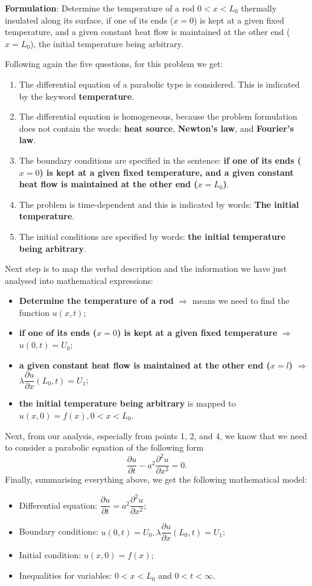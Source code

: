 {\bfseries Formulation}: Determine the temperature of a rod $0<x<L_{0}$ thermally insulated along its surface, if one of its ends ($x=0$) is kept at a given fixed temperature, and a given constant heat flow is maintained at the other end ($x=L_{0}$), the initial temperature being arbitrary.\par
Following again the five questions, for this problem we get:
\begin{enumerate}
\item The differential equation of a parabolic type is considered. This is indicated by the keyword {\bfseries temperature}.
\item The differential equation is homogeneous, because the problem formulation does not contain the words: {\bfseries heat source}, {\bfseries Newton's law}, and {\bfseries Fourier's law}.
\item The boundary conditions are specified in the sentence: {\bfseries if one of its ends ($x=0$) is kept at a given fixed temperature, and a given constant heat flow is maintained at the other end ($x=L_{0}$)}.
\item The problem is time-dependent and this is indicated by words: {\bfseries The initial temperature}.
\item The initial conditions are specified by words: {\bfseries the initial temperature being arbitrary}.
\end{enumerate}
Next step is to map the verbal description and the information we have just analysed into mathematical expressions:
\begin{itemize}
\item {\bfseries Determine the temperature of a rod} $\Longrightarrow$ means we need to find the function $u(x,t)$;
\item {\bfseries if one of its ends ($x=0$) is kept at a given fixed temperature} $\Longrightarrow$ $u(0,t)=U_{0}$;
\item {\bfseries a given constant heat flow is maintained at the other end ($x=l$)} $\Longrightarrow$ $\lambda \dfrac{\partial u}{\partial x}(L_{0},t)=U_{1}$;
\item {\bfseries the initial temperature being arbitrary} is mapped to $u(x,0)=f(x), 0<x<L_{0}$.
\end{itemize}
Next, from our analysis, especially from points 1, 2, and 4, we know that we need to consider a parabolic equation of the following form
\begin{equation*}
\frac{\partial u}{\partial t} - a^{2}\frac{\partial^{2} u}{\partial x^{2}} = 0.
\end{equation*}
Finally, summarising everything above, we get the following mathematical model:
\begin{itemize}
\item Differential equation: $\dfrac{\partial u}{\partial t} = a^{2}\dfrac{\partial^{2} u}{\partial x^{2}}$;
\item Boundary conditions: $u(0,t)=U_{0}, \lambda \dfrac{\partial u}{\partial x}(L_{0},t)=U_{1}$;
\item Initial condition: $u(x,0)=f(x)$;
\item Inequalities for variables: $0<x<L_{0}$ and $0<t<\infty$.
\end{itemize}


